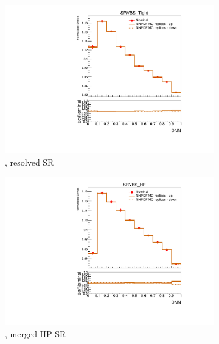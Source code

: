 \begin{figure}[ht]
    \centering
    \begin{subfigure}[b]{0.3\textwidth}
        \includegraphics[width=\textwidth]{figures/1lep/PDFUnc/NNPDF/W_0ptag2pjet_0ptv_SRVBS_Tight_DNN_SysTheoryPDF_NNPDF_W__1up_Norm.pdf}
        \caption{\Wjets, resolved SR}
    \end{subfigure}
    \begin{subfigure}[b]{0.3\textwidth}
        \includegraphics[width=\textwidth]{figures/1lep/PDFUnc/NNPDF/W_0ptag1pfat0pjet_0ptv_SRVBS_HP_DNN_SysTheoryPDF_NNPDF_W__1up_Norm.pdf}
        \caption{\Wjets, merged HP SR}
    \end{subfigure}
    \begin{subfigure}[b]{0.3\textwidth}

\end{subfigure}
\end{figure}
